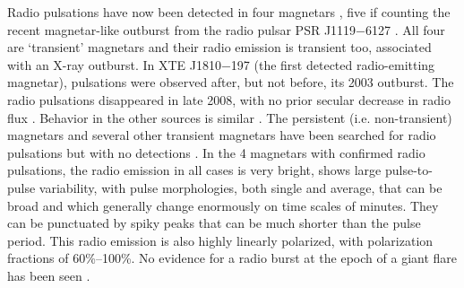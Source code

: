 Radio pulsations have now been
detected in four magnetars \citep{crh+06,crhr07,lbb+10,sj13,efk+13},
five if counting the recent magnetar-like outburst from the 
radio pulsar PSR J1119$-$6127 \citep{akts16}.  
All four are `transient' magnetars and their radio emission
is transient too, associated with an X-ray outburst.
In XTE J1810$-$197 (the first detected radio-emitting magnetar), pulsations were
observed after, but not before, its 2003 outburst.  The radio pulsations
disappeared in late 2008, with no prior secular decrease in radio flux \citep{crh+16}.
Behavior in the other sources is similar \citep{crhr07,lbb+12}.
The persistent (i.e. non-transient) magnetars and several other transient magnetars 
have been searched for radio pulsations but with no detections 
\citep[e.g.][]{lkc+12,tyl13}.  
In the 4 magnetars with confirmed radio pulsations, the radio emission in all
cases is very bright, shows large pulse-to-pulse variability, with pulse morphologies,
both single and average, that can be broad and which generally change enormously on time scales of minutes.
They can be punctuated by spiky peaks that can be much shorter than the
pulse period.  This radio emission is also
highly linearly polarized, with polarization fractions of 60\%--100\%.
No evidence for a radio burst at the epoch of a giant flare has been
seen \citep{tkp16}.




